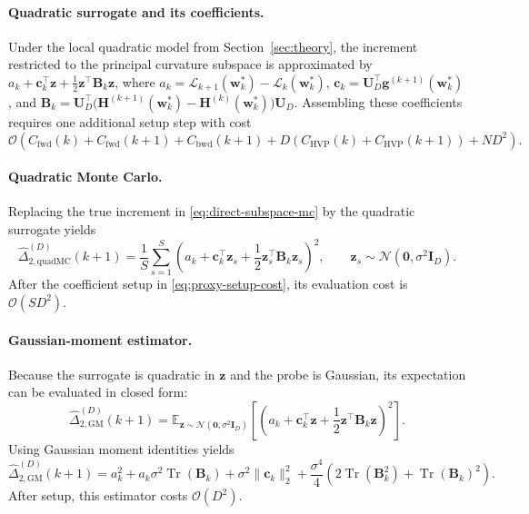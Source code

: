 \documentclass{article}
\begin{document}
\paragraph{Quadratic surrogate and its coefficients.}
Under the local quadratic model from Section~\ref{sec:theory}, the increment restricted to the principal curvature subspace is approximated by $a_k + \mathbf c_k^\top \mathbf z + \frac12 \mathbf z^\top \mathbf B_k \mathbf z$, where $a_k = \mathcal L_{k+1}(\mathbf w_k^*)-\mathcal L_k(\mathbf w_k^*)$, $\mathbf c_k = \mathbf U_D^\top \mathbf g^{(k+1)}(\mathbf w_k^*)$, and $\mathbf B_k = \mathbf U_D^\top \bigl( \mathbf H^{(k+1)}(\mathbf w_k^*)-\mathbf H^{(k)}(\mathbf w_k^*) \bigr) \mathbf U_D$. Assembling these coefficients requires one additional setup step with cost
\begin{equation}
\label{eq:proxy-setup-cost}
\mathcal O \left(
C_{\mathrm{fwd}}(k)+C_{\mathrm{fwd}}(k+1)
+
C_{\mathrm{bwd}}(k+1)
+
D(C_{\mathrm{HVP}}(k)+C_{\mathrm{HVP}}(k+1))
+
ND^2
\right).
\end{equation}

\paragraph{Quadratic Monte Carlo.}
Replacing the true increment in \eqref{eq:direct-subspace-mc} by the quadratic surrogate yields
\begin{equation}
\label{eq:quad-subspace-mc}
\widehat{\Delta}_{2,\mathrm{quadMC}}^{(D)}(k+1)
=
\frac{1}{S}\sum_{s=1}^S
\left(
a_k + \mathbf c_k^\top \mathbf z_s + \frac12 \mathbf z_s^\top \mathbf B_k \mathbf z_s
\right)^2,
\qquad
\mathbf z_s \sim \mathcal N(\mathbf 0,\sigma^2\mathbf I_D).
\end{equation}
After the coefficient setup in \eqref{eq:proxy-setup-cost}, its evaluation cost is $\mathcal O(SD^2)$.

\paragraph{Gaussian-moment estimator.}
Because the surrogate is quadratic in $\mathbf z$ and the probe is Gaussian, its expectation can be evaluated in closed form:
\begin{equation}
\label{eq:quad-closed-form}
\widehat{\Delta}_{2,\mathrm{GM}}^{(D)}(k+1)
=
\mathbb E_{\mathbf z\sim\mathcal N(\mathbf 0, \sigma^2 \mathbf I_D)}
\left[
\left(
a_k + \mathbf c_k^\top \mathbf z + \frac12 \mathbf z^\top \mathbf B_k \mathbf z
\right)^2
\right].
\end{equation}
Using Gaussian moment identities yields
\begin{equation}
\label{eq:quad-closed-form-expanded}
\widehat{\Delta}_{2,\mathrm{GM}}^{(D)}(k+1)
=
a_k^2
+
a_k \sigma^2 \operatorname{Tr}(\mathbf B_k)
+
\sigma^2 \|\mathbf c_k\|_2^2
+
\frac{\sigma^4}{4}
\left(
2\operatorname{Tr}(\mathbf B_k^2)
+
\operatorname{Tr}(\mathbf B_k)^2
\right).
\end{equation}
After setup, this estimator costs $\mathcal O(D^2)$.
\end{document}
